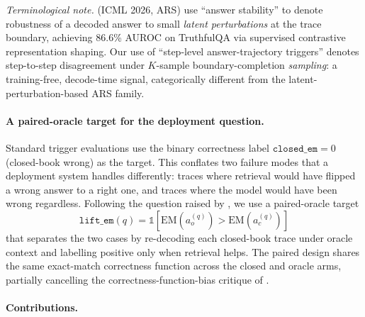 \documentclass[11pt]{article}
\begin{document}
\noindent\textit{Terminological note.}
\cite{Zhang_AnswerAgreementRepresentationShaping} (ICML 2026, ARS) use
``answer stability'' to denote robustness of a decoded answer to small
\emph{latent perturbations} at the trace boundary, achieving 86.6\% AUROC on
TruthfulQA via supervised contrastive representation shaping. Our use of
``step-level answer-trajectory triggers'' denotes step-to-step disagreement
under $K$-sample boundary-completion \emph{sampling}: a training-free,
decode-time signal, categorically different from the latent-perturbation-based
ARS family.

\paragraph{A paired-oracle target for the deployment question.}
Standard trigger evaluations use the binary correctness label
$\texttt{closed\_em}{=}0$ (closed-book wrong) as the target. This conflates
two failure modes that a deployment system handles differently: traces where
retrieval would have flipped a wrong answer to a right one, and traces where
the model would have been wrong regardless. Following the question raised by
\cite{Mallen_WhenNotToTrustLMs}, we use a paired-oracle target
\begin{equation*}
\texttt{lift\_em}(q) = \mathbb{1}\!\left[\mathrm{EM}(a_o^{(q)}) >
\mathrm{EM}(a_c^{(q)})\right]
\end{equation*}
that separates the two cases by re-decoding each closed-book trace under
oracle context and labelling positive only when retrieval helps. The paired
design shares the same exact-match correctness function across the closed
and oracle arms, partially cancelling the correctness-function-bias critique
of \citet{Ielanskyi_PitfallsUQEvaluationNLG}.

\paragraph{Contributions.}
\end{document}
